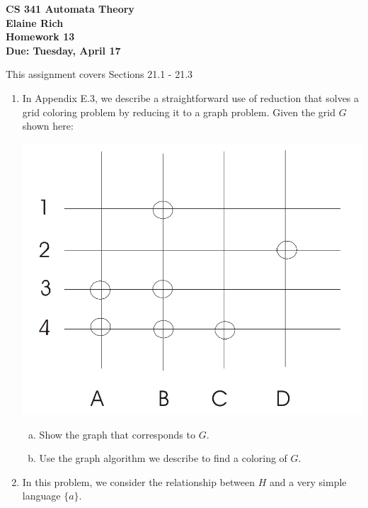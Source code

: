 \documentclass[10pt]{article}
\begin{document}
\begin{center}
\textbf{
CS 341 Automata Theory \\
Elaine Rich \\
Homework 13 \\
Due: Tuesday, April 17}\\
\end{center}

\noindent
This assignment covers Sections 21.1 - 21.3\\

\begin{enumerate}[1)]


\item
In Appendix E.3, we describe a straightforward use of reduction that solves a grid coloring problem by reducing it to a graph problem.  Given the grid $G$ shown here:
\begin{center}
\includegraphics[scale=.15]{images/p1.png}
\end{center}
\begin{enumerate}[a)]

\item
Show the graph that corresponds to $G$.

\item
Use the graph algorithm we describe to find a coloring of $G$.
\end{enumerate}



\item
In this problem, we consider the relationship between $H$ and a very simple language $\{a\}$.
\begin{enumerate}[a)]


\end{enumerate}
\end{enumerate}
\end{document}
